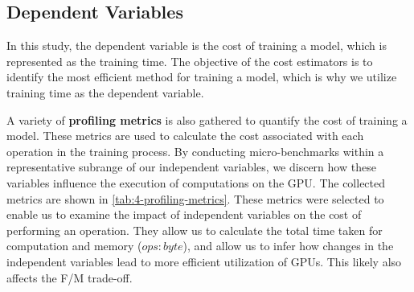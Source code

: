 \subsection{Dependent Variables}
In this study, the dependent variable is the cost of training a model, which is represented as the training time. The objective of the cost estimators is to identify the most efficient method for training a model, which is why we utilize training time as the dependent variable.

A variety of \textbf{profiling metrics} is also gathered to quantify the cost of training a model. These metrics are used to calculate the cost associated with each operation in the training process. By conducting micro-benchmarks within a representative subrange of our independent variables, we discern how these variables influence the execution of computations on the GPU. The collected metrics are shown in \autoref{tab:4-profiling-metrics}. These metrics were selected to enable us to examine the impact of independent variables on the cost of performing an operation. They allow us to calculate the total time taken for computation and memory ($ops:byte$), and allow us to infer how changes in the independent variables lead to more efficient utilization of GPUs. This likely also affects the F/M trade-off.

